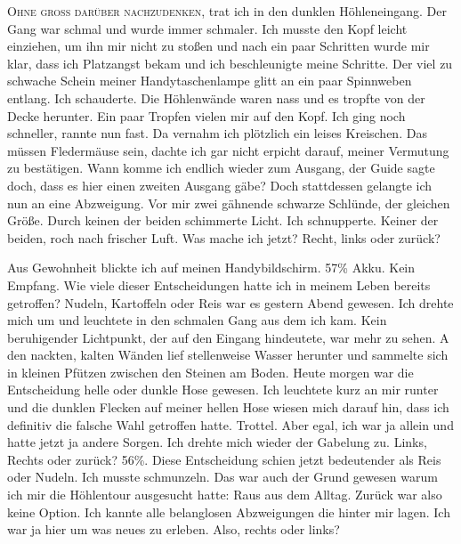 

\lettrine{O}{hne groß darüber nachzudenken}, trat ich in den dunklen Höhleneingang. Der Gang war schmal und wurde immer schmaler. Ich musste den Kopf leicht einziehen, um ihn mir nicht zu stoßen und nach ein paar Schritten wurde mir klar, dass ich Platzangst bekam und ich beschleunigte meine Schritte. Der viel zu schwache Schein meiner Handytaschenlampe glitt an ein paar Spinnweben entlang. Ich schauderte. Die Höhlenwände waren nass und es tropfte von der Decke herunter. Ein paar Tropfen vielen mir auf den Kopf. Ich ging noch schneller, rannte nun fast. Da vernahm ich plötzlich ein leises Kreischen. Das müssen Fledermäuse sein, dachte ich gar nicht erpicht darauf, meiner Vermutung zu bestätigen. Wann komme ich endlich wieder zum Ausgang, der Guide sagte doch, dass es hier einen zweiten Ausgang gäbe? Doch stattdessen gelangte ich nun an eine Abzweigung. Vor mir zwei gähnende schwarze Schlünde, der gleichen Größe. Durch keinen der beiden schimmerte Licht. Ich schnupperte. Keiner der beiden, roch nach frischer Luft. Was mache ich jetzt? Recht, links oder zurück?

Aus Gewohnheit blickte ich auf meinen Handybildschirm. 57\% Akku. Kein Empfang.
Wie viele dieser Entscheidungen hatte ich in meinem Leben bereits getroffen? Nudeln, Kartoffeln oder Reis war es gestern Abend gewesen. Ich drehte mich um und leuchtete in den schmalen Gang aus dem ich kam. Kein beruhigender Lichtpunkt, der auf den Eingang hindeutete, war mehr zu sehen. A den nackten, kalten Wänden lief stellenweise Wasser herunter und sammelte sich in kleinen Pfützen zwischen den Steinen am Boden. Heute morgen war die Entscheidung helle oder dunkle Hose gewesen. Ich leuchtete kurz an mir runter und die dunklen Flecken auf meiner hellen Hose wiesen mich darauf hin, dass ich definitiv die falsche Wahl getroffen hatte. Trottel. Aber egal, ich war ja allein und hatte jetzt ja andere Sorgen. Ich drehte mich wieder der Gabelung zu. Links, Rechts oder zurück? 56\%. Diese Entscheidung schien jetzt bedeutender als Reis oder Nudeln. Ich musste schmunzeln. Das war auch der Grund gewesen warum ich mir die Höhlentour ausgesucht hatte: Raus aus dem Alltag. Zurück war also keine Option. Ich kannte alle belanglosen Abzweigungen die hinter mir lagen. Ich war ja hier um was neues zu erleben. Also, rechts oder links?

